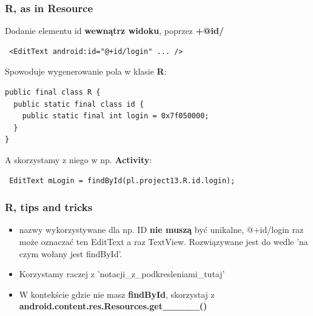 \documentclass{beamer}
\begin{document}
\begin{frame}[fragile]
 \frametitle{R, as in Resource}  
 Dodanie elementu id \textbf{wewnątrz widoku}, poprzez \textbf{+@id/}
\begin{lstlisting}
 <EditText android:id="@+id/login" ... />
\end{lstlisting}

\pause

Spowoduje wygenerowanie pola w klasie \textbf{R}:
\begin{lstlisting}
public final class R {
  public static final class id {
    public static final int login = 0x7f050000;
  }
}
\end{lstlisting}

\pause

A skorzystamy z niego w np. \textbf{Activity}:
\begin{lstlisting}
 EditText mLogin = findById(pl.project13.R.id.login);
\end{lstlisting}
\end{frame}

\begin{frame}
\frametitle{R, tips and tricks}

\begin{itemize}
 \item nazwy wykorzystywane dla np. ID \textbf{nie muszą} być unikalne, @+id/login raz może oznaczać ten EditText a raz TextView.
       Rozwiązywane jest do wedle 'na czym wołany jest findById'.
 \pause \item Korzystamy raczej z 'notacji\_z\_podkresleniami\_tutaj'
 \pause \item W kontekście gdzie nie masz \textbf{findById}, skorzystaj z \textbf{android.content.res.Resources.get\_\_\_\_\_()}
\end{itemize}


\end{frame}
\end{document}
